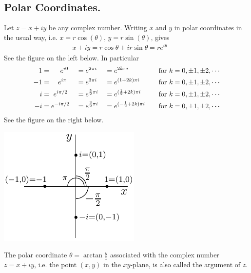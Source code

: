 \subsection{Polar Coordinates.}\label{ssec complex polar}
Let $z=x+iy$ be any complex number. Writing $x$ and $y$ in polar coordinates
in the usual way, i.e. $x=r\cos(\theta)$, $y=r\sin(\theta)$,  gives
\begin{align*}
x+iy=r\cos\theta+ir\sin\theta=re^{i\theta}\qquad
\end{align*}
See the figure on the left below. In particular
\begin{alignat*}{5}
1  &=\ \ \ \  e^{i0}      &&= e^{2\pi i}         &&= e^{2k\pi i}             
          &&\quad\text{for }k=0,\pm 1,\pm2,\cdots \\
-1 &=\ \ \  e^{i\pi}    &&= e^{3\pi i}         &&= e^{(1+2k)\pi i}         
          &&\quad\text{for }k=0,\pm 1,\pm2,\cdots \\
i  &=\   e^{i\pi/2}  &&= e^{{5\over 2}\pi i} &&= e^{({1\over 2}+2k)\pi i}
          &&\quad\text{for }k=0,\pm 1,\pm2,\cdots \\
-i &=  e^{-i\pi/2} &&=e^{{3\over 2}\pi i}  &&= e^{(-{1\over 2}+2k)\pi i}
          &&\quad\text{for }k=0,\pm 1,\pm2,\cdots 
\end{alignat*}
See the figure on the right below.
\begin{efig}
\begin{center}
   \qquad \includegraphics{polar2}
\end{center}
\end{efig}
The polar coordinate $\theta=\arctan\frac{y}{x}$ associated with the
complex number $z=x+iy$, i.e. the point $(x,y)$ in the $xy$-plane,
is also called the argument of $z$.

